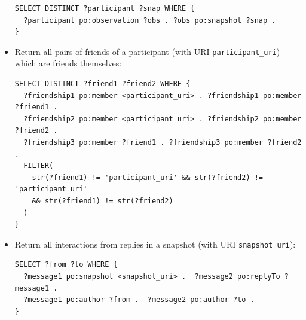 \documentclass[data,datadescriptor,submit,moreauthors,pdftex]{Definitions/mdpi}
\newcommand{\te}[1] {\texttt{\footnotesize#1}}
\begin{document}
\begin{itemize}
\begin{lstlisting}[language=spq]
SELECT DISTINCT ?participant ?snap WHERE {
  ?participant po:observation ?obs . ?obs po:snapshot ?snap .
}
\end{lstlisting}
  \item Return all pairs of friends of a participant (with URI \te{participant\_uri}) which are friends themselves:
\begin{lstlisting}[language=spq]
SELECT DISTINCT ?friend1 ?friend2 WHERE {
  ?friendship1 po:member <participant_uri> . ?friendship1 po:member ?friend1 .
  ?friendship2 po:member <participant_uri> . ?friendship2 po:member ?friend2 .
  ?friendship3 po:member ?friend1 . ?friendship3 po:member ?friend2 .
  FILTER(
    str(?friend1) != 'participant_uri' && str(?friend2) != 'participant_uri'
    && str(?friend1) != str(?friend2)
  )
}
\end{lstlisting}
  \item Return all interactions from replies in a snapshot (with URI \te{snapshot\_uri}):
\begin{lstlisting}[language=spq]
SELECT ?from ?to WHERE {
  ?message1 po:snapshot <snapshot_uri> .  ?message2 po:replyTo ?message1 .
  ?message1 po:author ?from .  ?message2 po:author ?to .
}
\end{lstlisting}
\end{itemize}
\end{document}
